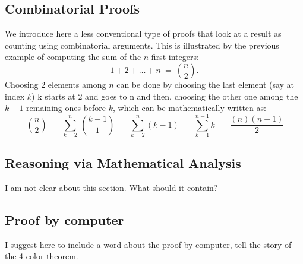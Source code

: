 \subsection{Combinatorial Proofs}

We introduce here a less conventional type of proofs that look at a result
as counting using combinatorial arguments.
This is illustrated by the previous example of computing the sum of the $n$ first integers:
\[ 1+2+ \ldots + n \ = \ {n \choose 2}.  \]
Choosing $2$ elements among $n$ can be done by choosing the last element (say at index $k$)
{\Denis k starts at 2 and goes to n}
and then, choosing the other one among the $k-1$ remaining ones before $k$, 
which can be mathematically written as:
\[ \ {n \choose 2} \ = \  \sum_{k=2}^n  \ {k-1 \choose 1} \ = \  \sum_{k=2}^n  (k-1) \ = \  \sum_{k=1}^{n-1}  k \ = \ \frac{(n)(n-1)}{2}\]


\subsection{Reasoning via Mathematical Analysis}
\label{sec:analysis}

{\Denis I am not clear about this section.
What should it contain?}


\subsection{Proof by computer}

{\Denis I suggest here to include a word about the proof by computer, tell the story of 
the 4-color theorem.}


